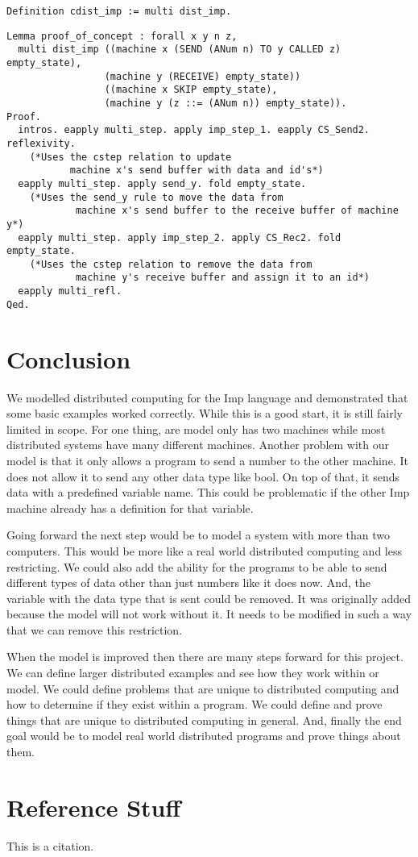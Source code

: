 \documentclass{llncs}
\begin{document}
\begin{lstlisting}
Definition cdist_imp := multi dist_imp.
\end{lstlisting}

\begin{lstlisting}
Lemma proof_of_concept : forall x y n z,
  multi dist_imp ((machine x (SEND (ANum n) TO y CALLED z) empty_state),
                 (machine y (RECEIVE) empty_state))
                 ((machine x SKIP empty_state), 
                 (machine y (z ::= (ANum n)) empty_state)).
Proof. 
  intros. eapply multi_step. apply imp_step_1. eapply CS_Send2. reflexivity.
    (*Uses the cstep relation to update
           machine x's send buffer with data and id's*)
  eapply multi_step. apply send_y. fold empty_state. 
    (*Uses the send_y rule to move the data from
            machine x's send buffer to the receive buffer of machine y*)
  eapply multi_step. apply imp_step_2. apply CS_Rec2. fold empty_state. 
    (*Uses the cstep relation to remove the data from 
            machine y's receive buffer and assign it to an id*)
  eapply multi_refl. 
Qed.
\end{lstlisting}

\section{Conclusion}
We modelled distributed computing for the Imp language and demonstrated that some basic examples worked correctly. While this is a good start, it is still fairly limited in scope. For one thing, are model only has two machines while most distributed systems have many different machines. Another problem with our model is that it only allows a program to send a number to the other machine. It does not allow it to send any other data type like bool. On top of that, it sends data with a predefined variable name. This could be problematic if the other Imp machine already has a definition for that variable. 

Going forward the next step would be to model a system with more than two computers. This would be more like a real world distributed computing and less restricting. We could also add the ability for the programs to be able to send different types of data other than just numbers like it does now. And, the variable with the data type that is sent could be removed. It was originally added because the model will not work without it. It needs to be modified in such a way that we can remove this restriction. 

When the model is improved then there are many steps forward for this project. We can define larger distributed examples and see how they work within or model. We could define problems that are unique to distributed computing and how to determine if they exist within a program. We could define and prove things that are unique to distributed computing in general. And, finally the end goal would be to model real world distributed programs and prove things about them. 

\section{Reference Stuff}
This is a citation.~\cite{gennaro2010non}



\end{document}
